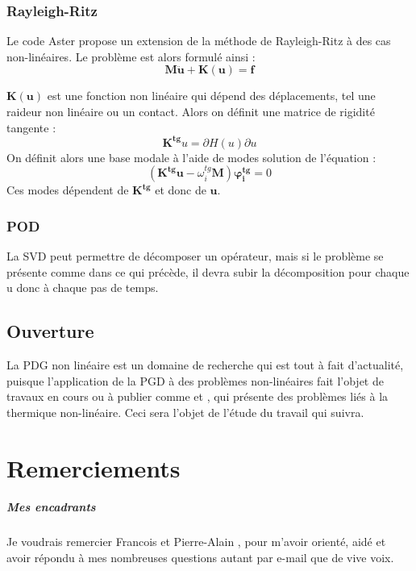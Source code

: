 \documentclass[12pt,a4paper]{report}
\begin{document}
\subsection{Rayleigh-Ritz}
\label{NonLinRR}
Le code Aster propose un extension de la méthode de Rayleigh-Ritz à des cas non-linéaires. Le problème est alors formulé ainsi :
\[
\mathbf{M}\mathbf{\ddot{u}} + \mathbf{K}(\mathbf{u}) = \mathbf{f}
\]

$\mathbf{K}(\mathbf{u})$ est une fonction non linéaire qui dépend des déplacements, tel une raideur non linéaire ou un contact. Alors on définit une matrice de rigidité tangente :
\[
\mathbf{\mathbf{K}^{tg}} u =
\partial H(u)
\partial u
\]
On définit alors une base modale à l'aide de modes solution de l'équation :
\[
\left( \mathbf{\mathbf{K}^{tg}} \mathbf{u} 
	- \omega^{tg}_i \mathbf{M} 
\right) \boldsymbol{\varphi^{tg}_i} = 0
\]
Ces modes dépendent de $\mathbf{\mathbf{K}^{tg}}$ et donc de $\mathbf{u}$.
\subsection{POD}
La SVD peut permettre de décomposer un opérateur, mais si le problème se présente comme dans ce qui précède, il devra subir la décomposition pour chaque u donc à chaque pas de temps.
\section{Ouverture}
La PDG non linéaire est un domaine de recherche qui est tout à fait d'actualité, puisque l'application de la PGD à des problèmes non-linéaires fait l'objet de travaux en cours ou à publier comme \cite{performante} et \cite{fonderie}, qui présente des problèmes liés à la thermique non-linéaire. Ceci sera l'objet de l'étude du travail qui suivra.





\newpage

\appendix
\chapter{Remerciements}

\paragraph{Mes encadrants} 
Je voudrais remercier Francois  et Pierre-Alain , pour m'avoir orienté, aidé et avoir répondu à mes nombreuses questions autant par e-mail que de vive voix.
\end{document}
